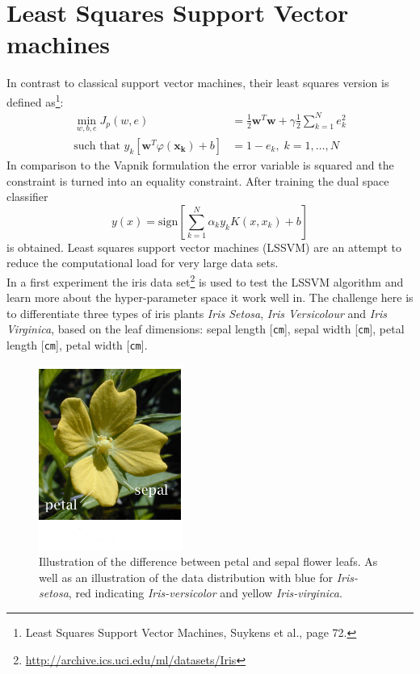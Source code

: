 \section{Least Squares Support Vector machines}
In contrast to classical support vector machines, their least squares version is defined as\footnote{Least Squares Support Vector Machines, Suykens et al., page 72.}:
\begin{align}
\min_{w,b,e} J_p (w,e) &= \frac{1}{2}\mathbf{w}^T\mathbf{w} + \gamma \frac{1}{2} \sum_{k=1}^N e_k^2 \\
\text{such that } y_k [\mathbf{w}^T \varphi(\mathbf{x_k}) + b] &= 1 - e_k, \; k = 1,\dots,N
\end{align}
In comparison to the Vapnik formulation the error variable is squared and the constraint is turned into an equality constraint. After training the dual space classifier
\begin{equation}
y(x) = \text{sign}[\sum_{k = 1}^N \alpha_k y_k K(x,x_k) + b]
\end{equation}
is obtained. Least squares support vector machines (LSSVM) are an attempt to reduce the computational load for very large data sets. \\
In a first experiment the iris data set\footnote{\url{http://archive.ics.uci.edu/ml/datasets/Iris}} is used to test the LSSVM algorithm and learn more about the hyper-parameter space it work well in. The challenge here is to differentiate three types of iris plants \textit{Iris Setosa}, \textit{Iris Versicolour} and \textit{Iris Virginica}, based on the leaf dimensions: sepal length [\texttt{cm}], sepal width [\texttt{cm}], petal length [\texttt{cm}], petal width [\texttt{cm}].
\begin{figure}
\centering
\includegraphics[width=0.25\linewidth]{../src/figure/petalSepalUP}


\caption{Illustration of the difference between petal and sepal flower leafs. As well as an illustration of the data distribution with blue for \textit{Iris-setosa}, red indicating \textit{Iris-versicolor} and yellow \textit{Iris-virginica}.}
\label{fig:originalIris}
\end{figure}
